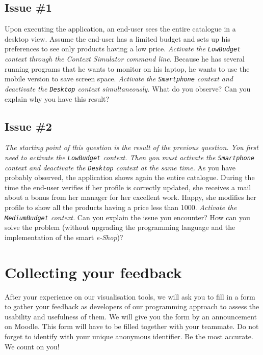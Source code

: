 \documentclass{article}
\begin{document}
\subsection*{Issue \#1}

Upon executing the application, an end-user sees the entire catalogue in a desktop view. Assume the end-user has a limited budget and sets up his preferences to see only products having a low price. \emph{Activate the \texttt{LowBudget} context through the Context Simulator command line.} Because he has several running programs that he wants to monitor on his laptop, he wants to use the mobile version to save screen space. \emph{Activate the \texttt{Smartphone} context and deactivate the \texttt{Desktop} context simultaneously.} What do you observe? Can you explain why you have this result?

\subsection*{Issue \#2}

\emph{The starting point of this question is the result of the previous question. You first need to activate the \texttt{LowBudget} context. Then you must activate the \texttt{Smartphone} context and deactivate the \texttt{Desktop} context at the same time.}
As you have probably observed, the application shows again the entire catalogue. During the time the end-user verifies if her profile is correctly updated, she receives a mail about a bonus from her manager for her excellent work. Happy, she modifies her profile to show all the products having a price less than 1000. \emph{Activate the \texttt{MediumBudget} context.} Can you explain the issue you encounter? How can you solve the problem (without upgrading the programming language and the implementation of the smart \emph{e-Shop})?

\section{Collecting your feedback}
 
\begin{tcolorbox}[arc=1ex, colback=experiment, colframe=experiment, left=3pt, right=3pt, top=3pt, bottom=2pt]
After your experience on our visualisation tools, we will ask you to fill in a form to gather your feedback as developers of our programming approach to assess the usability and usefulness of them. We will give you the form by an announcement on Moodle. This form will have to be filled together with your teammate. Do not forget to identify with your unique anonymous identifier. Be the most accurate. We count on you!
\end{tcolorbox}
\end{document}
